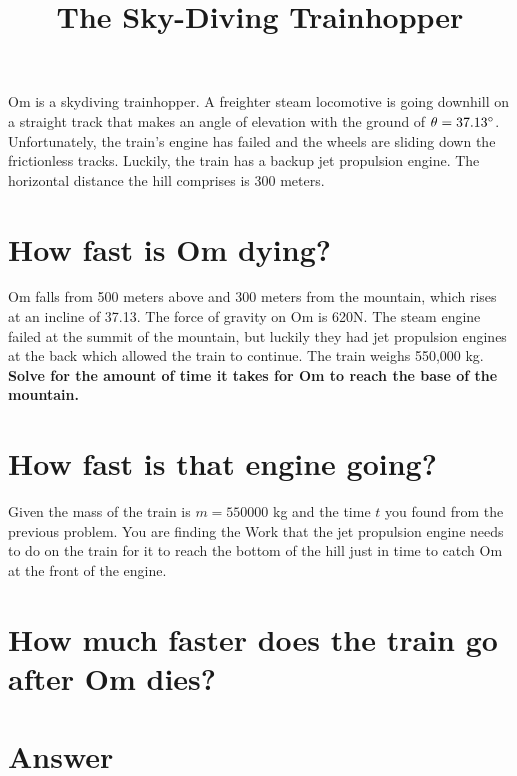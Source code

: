 \documentclass{article}
\title{\vspace{-3em}The Sky-Diving Trainhopper\vspace{-3em}}
\begin{document}
\fontsize{14}{16}\selectfont

\maketitle

Om is a skydiving trainhopper. A freighter steam locomotive is going downhill on a straight track that makes an angle of elevation with the ground of $\theta=37.13\degree$. Unfortunately, the train's engine has failed and the wheels are sliding down the frictionless tracks. Luckily, the train has a backup jet propulsion engine. The horizontal distance the hill comprises is 300 meters.

\section{How fast is Om dying?}

Om falls from 500 meters above and 300 meters from the mountain, which rises at an incline of 37.13\degree. The force of gravity on Om is 620N. The steam engine failed at the summit of the mountain, but luckily they had jet propulsion engines at the back which allowed the train to continue. The train weighs 550,000 kg. \textbf{Solve for the amount of time it takes for Om to reach the base of the mountain.}


\section{How fast is that engine going?}
Given the mass of the train is $m=550000$ kg and the time $t$ you found from the previous problem. You are finding the Work that the jet propulsion engine needs to do on the train for it to reach the bottom of the hill just in time to catch Om at the front of the engine.

\section{How much faster does the train go after Om dies?}

\pagebreak

\section{Answer}
\end{document}
